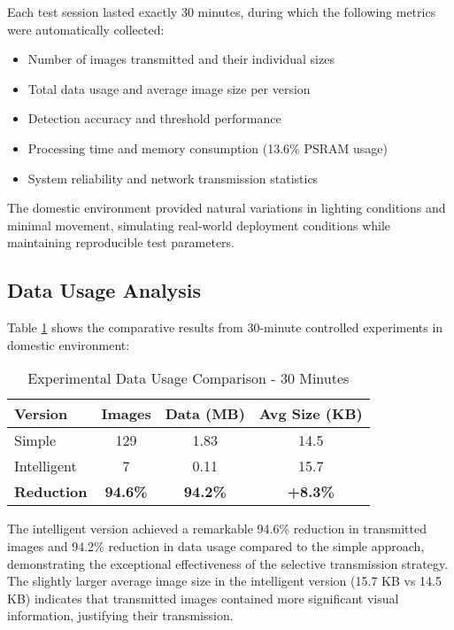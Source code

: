 \documentclass[conference]{IEEEtran}
\begin{document}
Each test session lasted exactly 30 minutes, during which the following metrics were automatically collected:
\begin{itemize}
\item Number of images transmitted and their individual sizes
\item Total data usage and average image size per version
\item Detection accuracy and threshold performance
\item Processing time and memory consumption (13.6\% PSRAM usage)
\item System reliability and network transmission statistics
\end{itemize}

The domestic environment provided natural variations in lighting conditions and minimal movement, simulating real-world deployment conditions while maintaining reproducible test parameters.

\subsection{Data Usage Analysis}

Table \ref{tab:data_usage} shows the comparative results from 30-minute controlled experiments in domestic environment:

\begin{table}[htbp]
\caption{Experimental Data Usage Comparison - 30 Minutes}
\begin{center}
\begin{tabular}{|l|c|c|c|}
\hline
\textbf{Version} & \textbf{Images} & \textbf{Data (MB)} & \textbf{Avg Size (KB)} \\
\hline
Simple & 129 & 1.83 & 14.5 \\
\hline
Intelligent & 7 & 0.11 & 15.7 \\
\hline
\textbf{Reduction} & \textbf{94.6\%} & \textbf{94.2\%} & \textbf{+8.3\%} \\
\hline
\end{tabular}
\label{tab:data_usage}
\end{center}
\end{table}

The intelligent version achieved a remarkable 94.6\% reduction in transmitted images and 94.2\% reduction in data usage compared to the simple approach, demonstrating the exceptional effectiveness of the selective transmission strategy. The slightly larger average image size in the intelligent version (15.7 KB vs 14.5 KB) indicates that transmitted images contained more significant visual information, justifying their transmission.
\end{document}
